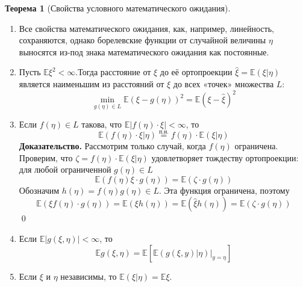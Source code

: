 \documentclass[oneside,final,14pt]{extreport}
\renewenvironment{proof}{{\bfseries Доказательство.}}{\qed}
\theoremstyle{plain}
\theoremstyle{definition}
\theoremstyle{named}
\newtheorem*{namedthm}{Теорема}
\begin{document}
\begin{namedthm}[Свойства условного математического ожидания]\leavevmode
    \begin{enumerate}
        \item Все свойства математического ожидания, как, например, линейность, сохраняются, однако борелевские функции от случайной величины $\eta$ выносятся из-под знака математического ожидания как постоянные.
        \item Пусть $\mathbb{E} \xi^{2}<\infty$.Тогда расстояние от $\xi$ до её ортопроекции $\widehat{\xi}=\mathbb{E}(\xi | \eta)$ является наименьшим из расстояний от $\xi$ до всех «точек» множества $L$:
        \begin{equation*}
            \min_{g(\eta) \in L} \mathbb{E}(\xi-g(\eta))^{2}=\mathbb{E}(\xi-\widehat{\xi})^{2}
        \end{equation*}
        \item Если $f(\eta) \in L$ такова, что $\mathbb{E}|f(\eta) \cdot \xi|<\infty$, то
        \begin{equation*}
            \mathbb{E}(f(\eta) \cdot \xi | \eta)
            \stackrel{\text{п.н.}}{=}
            f(\eta) \cdot \mathbb{E}(\xi | \eta)
        \end{equation*}
        \begin{proof}
            Рассмотрим только случай, когда $f(\eta)$ ограничена. Проверим, что $\zeta=f(\eta) \cdot \mathbb{E}(\xi | \eta)$ удовлетворяет тождеству ортопроекции: для любой ограниченной $g(\eta) \in L$
            \begin{equation*}
                \mathbb{E}(f(\eta) \xi \cdot g(\eta))=\mathbb{E}(\zeta \cdot g(\eta))
            \end{equation*}
            Обозначим $h(\eta)=f(\eta) g(\eta) \in L$. Эта функция ограничена, поэтому
            \begin{equation*}
                \mathbb{E}(\xi f(\eta) \cdot g(\eta))=\mathbb{E}(\xi h(\eta))=\mathbb{E}(\widehat{\xi} h(\eta))=\mathbb{E}(\zeta \cdot g(\eta))
            \end{equation*}
        \end{proof}
        \item Если $\mathbb{E}|g(\xi, \eta)|<\infty$, то
        \begin{equation*}
            \mathbb{E} g(\xi, \eta)=\mathbb{E}\left[\left.\mathbb{E}(g(\xi, y) | \eta)\right|_{y=\eta}\right]
        \end{equation*}
        \item Если $\xi$ и $\eta$ независимы, то $\mathbb{E}(\xi | \eta)=\mathbb{E} \xi$.
    \end{enumerate}
\end{namedthm}
\end{document}
